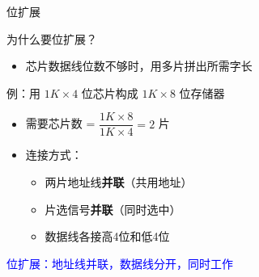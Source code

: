\documentclass[10pt, aspectratio=169]{beamer}
\begin{document}
\begin{frame}{位扩展}
    \begin{block}{为什么要位扩展？}
        \begin{itemize}
            \item 芯片数据线位数不够时，用多片拼出所需字长
        \end{itemize}
    \end{block}
    \vspace{0.3em}
    \begin{exampleblock}{例：用 $1K \times 4$ 位芯片构成 $1K \times 8$ 位存储器}
        \begin{itemize}
            \item 需要芯片数 = $\dfrac{1K \times 8}{1K \times 4} = 2$ 片
            \item 连接方式：
            \begin{itemize}
                \item 两片地址线\textbf{并联}（共用地址）
                \item 片选信号\textbf{并联}（同时选中）
                \item 数据线各接高4位和低4位
            \end{itemize}
        \end{itemize}
    \end{exampleblock}
    \vspace{0.3em}
    \begin{center}
        \textcolor{blue}{位扩展：地址线并联，数据线分开，同时工作}
    \end{center}
\end{frame}
\end{document}
